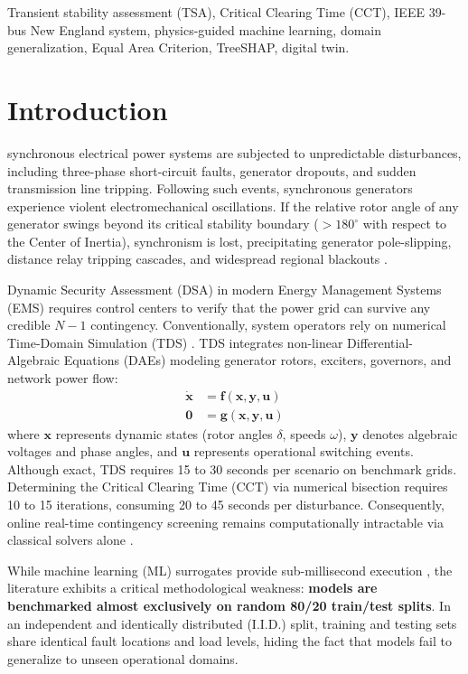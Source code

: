\documentclass[journal]{IEEEtran}
\begin{document}
\begin{IEEEkeywords}
Transient stability assessment (TSA), Critical Clearing Time (CCT), IEEE 39-bus New England system, physics-guided machine learning, domain generalization, Equal Area Criterion, TreeSHAP, digital twin.
\end{IEEEkeywords}

\section{Introduction}
 synchronous electrical power systems are subjected to unpredictable disturbances, including three-phase short-circuit faults, generator dropouts, and sudden transmission line tripping. Following such events, synchronous generators experience violent electromechanical oscillations. If the relative rotor angle of any generator swings beyond its critical stability boundary ($>180^\circ$ with respect to the Center of Inertia), synchronism is lost, precipitating generator pole-slipping, distance relay tripping cascades, and widespread regional blackouts \cite{kundur1994power}.

Dynamic Security Assessment (DSA) in modern Energy Management Systems (EMS) requires control centers to verify that the power grid can survive any credible $N-1$ contingency. Conventionally, system operators rely on numerical Time-Domain Simulation (TDS) \cite{anderson2003power}. TDS integrates non-linear Differential-Algebraic Equations (DAEs) modeling generator rotors, exciters, governors, and network power flow:
\begin{align}
\dot{\mathbf{x}} &= \mathbf{f}(\mathbf{x}, \mathbf{y}, \mathbf{u}) \\
\mathbf{0} &= \mathbf{g}(\mathbf{x}, \mathbf{y}, \mathbf{u})
\end{align}
where $\mathbf{x}$ represents dynamic states (rotor angles $\delta$, speeds $\omega$), $\mathbf{y}$ denotes algebraic voltages and phase angles, and $\mathbf{u}$ represents operational switching events. Although exact, TDS requires 15 to 30 seconds per scenario on benchmark grids. Determining the Critical Clearing Time (CCT) via numerical bisection requires 10 to 15 iterations, consuming 20 to 45 seconds per disturbance. Consequently, online real-time contingency screening remains computationally intractable via classical solvers alone \cite{cui2021andes}.

While machine learning (ML) surrogates provide sub-millisecond execution \cite{chen2021extreme}, the literature exhibits a critical methodological weakness: \textbf{models are benchmarked almost exclusively on random 80/20 train/test splits}. In an independent and identically distributed (I.I.D.) split, training and testing sets share identical fault locations and load levels, hiding the fact that models fail to generalize to unseen operational domains.
\end{document}
